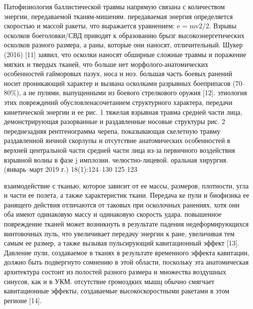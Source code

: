 Патофизиология баллистической травмы напрямую связана с количеством энергии,
передаваемой тканям-мишеням. передаваемая энергия определяется скоростью и
массой ракеты, что выражается уравнением: e = mv2/2. Взрывы осколков
боеголовки/СВД приводят к образованию брызг высокоэнергетических осколков
разного размера, а раны, которые они наносят, отличительный. Шукер (2016) [11]
заявил, что осколки наносят обширные сложные травмы и поражение мягких и твердых
тканей, что больше нет морфолого-анатомических особенностей гайморовых пазух,
носа и ноэ. большая часть боевых ранений носит проникающий характер и вызвана
осколками разрывных боеприпасов (70–80\%), а не пулями, выпущенными из боевого
стрелкового оружия [12]. этиология этих повреждений обусловлена
​​сочетанием структурного характера, передачи кинетической энергии и
ее рис. 1 тяжелая взрывная травма средней части лица, демонстрирующая
разорванные и раздавленные носовые структуры рис. 2 переднезадняя
рентгенограмма черепа, показывающая скелетную травму раздавленной яичной
скорлупы и отсутствие анатомических особенностей в верхней центральной части
средней части лица из-за первичного воздействия взрывной волны в фазе j
имплозии. челюстно-лицевой. оральная хирургия. (январь–март 2019 г.)
18(1):124–130 125 123

взаимодействие с тканью, которое зависит от ее массы, размеров, плотности, угла
и части ее полета, а также характеристик ткани. Передача ке пули и биофизика ее
ранящего действия отличаются от таковых при осколочных ранениях, хотя они оба
имеют одинаковую массу и одинаковую скорость удара. повышенное повреждение
тканей может возникнуть в результате падения недеформирующихся винтовочных пуль,
что увеличивает передачу энергии к ране, увеличивая тем самым ее размер, а также
вызывая пульсирующий кавитационный эффект [13]. Давление пули, создаваемое в
тканях в результате временного эффекта кавитации, должно быть подвергнуто
сомнению в этой области, поскольку эта анатомическая архитектура состоит из
полостей разного размера и множества воздушных синусов, как и в УКМ. отсутствие
громоздких мышц обычно смягчает кавитационные эффекты, создаваемые
высокоскоростными ракетами в этом регионе [14].


